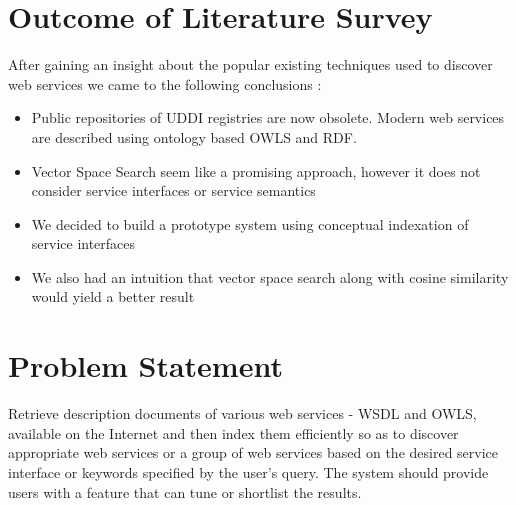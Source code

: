 \documentclass[12pt, oneside]{book}
\begin{document}
\section{Outcome of Literature Survey}
After gaining an insight about the popular existing techniques used to discover web services we came to the following conclusions :
\begin{itemize}
 \item Public repositories of UDDI registries are now obsolete. Modern web services are described using ontology based OWLS and RDF.
 \item Vector Space Search seem like a promising approach, however it does not consider service interfaces or service semantics
 \item We decided to build a prototype system using conceptual indexation of service interfaces
 \item We also had an intuition that vector space search along with cosine similarity would yield a better result
\end{itemize}

\section{Problem Statement}
Retrieve description documents of various web services - WSDL and OWLS, available on the Internet and then index them efficiently so as to discover appropriate web services or a group of web services based on the desired service interface or keywords specified by the user's query. The system should provide users with a feature that can tune or shortlist the results.
\end{document}

